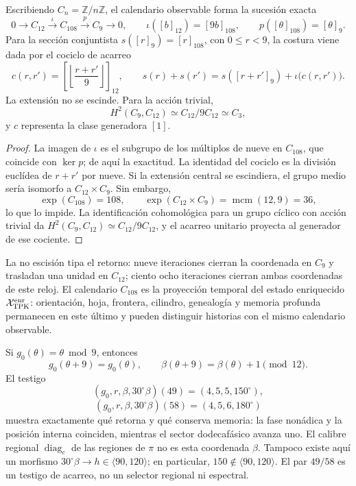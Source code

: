 \begin{proposition}
\label{prop:extension-central-108-no-escindida-rev8}
Escribiendo \(C_n=\mathbb Z/n\mathbb Z\), el calendario observable forma la
sucesión exacta
\[
 0\longrightarrow C_{12}
 \xrightarrow{\ \iota\ }C_{108}
 \xrightarrow{\ p\ }C_9
 \longrightarrow0,
 \qquad
 \iota([b]_{12})=[9b]_{108},\qquad
 p([\theta]_{108})=[\theta]_9.
\]
Para la sección conjuntista \(s([r]_9)=[r]_{108}\), con
\(0\leq r<9\), la costura viene dada por el cociclo de acarreo
\[
 c(r,r')=
 \left[\left\lfloor\frac{r+r'}{9}\right\rfloor\right]_{12},
 \qquad
 s(r)+s(r')=s([r+r']_9)+\iota\bigl(c(r,r')\bigr).
\]
La extensión no se escinde. Para la acción trivial,
\[
 H^2(C_9,C_{12})
 \simeq C_{12}/9C_{12}
 \simeq C_3,
\]
y \(c\) representa la clase generadora \([1]\).
\end{proposition}

\begin{proof}
La imagen de \(\iota\) es el subgrupo de los múltiplos de nueve en
\(C_{108}\), que coincide con \(\ker p\); de aquí la exactitud. La identidad
del cociclo es la división euclídea de \(r+r'\) por nueve. Si la extensión
central se escindiera, el grupo medio sería isomorfo a
\(C_{12}\times C_9\). Sin embargo,
\[
 \exp(C_{108})=108,\qquad
 \exp(C_{12}\times C_9)=\operatorname{mcm}(12,9)=36,
\]
lo que lo impide. La identificación cohomológica para un grupo cíclico con
acción trivial da \(H^2(C_9,C_{12})\simeq C_{12}/9C_{12}\), y el acarreo
unitario proyecta al generador de ese cociente.
\end{proof}

La no escisión tipa el retorno: nueve iteraciones cierran la coordenada en
\(C_9\) y trasladan una unidad en \(C_{12}\); ciento ocho iteraciones cierran ambas
coordenadas de este reloj. El calendario \(C_{108}\) es la proyección
temporal del estado enriquecido \(\mathcal X_{\rm TPK}^{\rm enr}\):
orientación, hoja, frontera, cilindro, genealogía y memoria profunda
permanecen en este último y pueden
distinguir historias con el mismo calendario observable.

Si \(g_0(\theta)=\theta\bmod9\), entonces
\[
 g_0(\theta+9)=g_0(\theta),\qquad
 \beta(\theta+9)=\beta(\theta)+1\pmod{12}.
\]
El testigo
\[
 (g_0,r,\beta,30^\circ\beta)(49)=(4,5,5,150^\circ),
\]
\[
 (g_0,r,\beta,30^\circ\beta)(58)=(4,5,6,180^\circ)
\]
muestra exactamente qué retorna y qué conserva memoria: la fase nonádica y
la posición interna coinciden, mientras el sector dodecafásico avanza uno.
El calibre regional \(\operatorname{diag}_c\) de las regiones de \(\pi\) no
es esta coordenada \(\beta\). Tampoco existe aquí un morfismo
\(30^\circ\beta\to h\in\langle90,120\rangle\); en particular,
\(150\notin\langle90,120\rangle\). El par \(49/58\) es un testigo de acarreo,
no un selector regional ni espectral.

